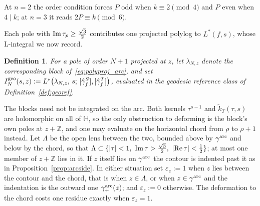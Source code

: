 \documentclass[11pt]{article}
\newtheorem{definition}[theorem]{Definition}
\newcommand{\HH}{\mathbb{H}}
\newcommand{\ZZ}{\mathbb{Z}}
\newcommand{\tk}{\widetilde{k}_T}
\begin{document}
At $n=2$ the order condition forces $P$ odd when $k\equiv2\pmod4$ and $P$ even when $4\mid k$; at
$n=3$ it reads $2P\equiv k\pmod 6$.

Each pole with ${\rm Im}\,\tau_p\ge\tfrac{\sqrt3}{2}$ contributes one projected polylog to
$L^*(f,s)$, whose L-integral we now record.

\begin{definition}\label{def:geoIN}
For a pole of order $N+1$ projected at $z$, let $\lambda_{N,z}$ denote the corresponding block
of~\eqref{eq:polyproj_arc}, and set
$I^{\rm geo}_N(s,z):=L^*\big(\lambda_{N,z},\,s;\,[\hat\gamma^S_f],[\hat\gamma^T_f]\big)$,
evaluated in the geodesic reference class of Definition~\ref{def:georef}.
\end{definition}

The blocks need not be integrated on the arc. Both kernels $\tau^{s-1}$ and $\tk(\tau,s)$ are
holomorphic on all of $\HH$, so the only obstruction to deforming is the block's own poles at
$z+\ZZ$, and one may evaluate on the horizontal chord from $\rho$ to $\rho+1$ instead. Let
$\Lambda$ be the open lens between the two, bounded above by $\gamma^{\rm arc}$ and below by the
chord, so that
$\Lambda\subset\{|\tau|<1,\ {\rm Im}\,\tau>\tfrac{\sqrt3}{2},\ |{\rm Re}\,\tau|<\tfrac12\}$; at
most one member of $z+\ZZ$ lies in it. If $z$ itself lies on $\gamma^{\rm arc}$ the contour is
indented past it as in Proposition~\ref{prop:arcside}. In either situation set $\varepsilon_z:=1$
when $z$ lies between the contour and the chord, that is when $z\in\Lambda$, or when
$z\in\gamma^{\rm arc}$ and the indentation is the outward one $\gamma^{\rm arc}_+(z)$; and
$\varepsilon_z:=0$ otherwise. The deformation to the chord costs one residue exactly when
$\varepsilon_z=1$.
\end{document}
